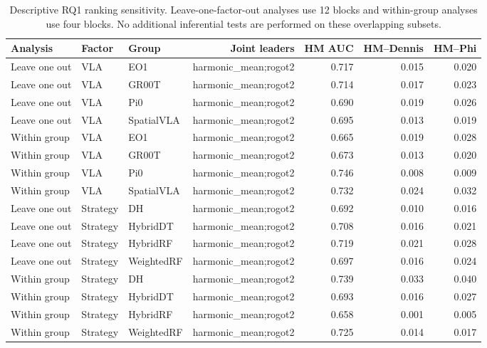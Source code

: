 \begin{table}[t]
\centering
\caption{Descriptive RQ1 ranking sensitivity. Leave-one-factor-out analyses use 12 blocks and within-group analyses use four blocks. No additional inferential tests are performed on these overlapping subsets.}
\label{tab:rq1-ranking-sensitivity}
{\scriptsize
\begin{tabular}{lllrrrr}
\toprule
Analysis & Factor & Group & Joint leaders & HM AUC & HM--Dennis & HM--Phi \\
\midrule
Leave one out & VLA & EO1 & harmonic\_mean;rogot2 & 0.717 & 0.015 & 0.020 \\
Leave one out & VLA & GR00T & harmonic\_mean;rogot2 & 0.714 & 0.017 & 0.023 \\
Leave one out & VLA & Pi0 & harmonic\_mean;rogot2 & 0.690 & 0.019 & 0.026 \\
Leave one out & VLA & SpatialVLA & harmonic\_mean;rogot2 & 0.695 & 0.013 & 0.019 \\
Within group & VLA & EO1 & harmonic\_mean;rogot2 & 0.665 & 0.019 & 0.028 \\
Within group & VLA & GR00T & harmonic\_mean;rogot2 & 0.673 & 0.013 & 0.020 \\
Within group & VLA & Pi0 & harmonic\_mean;rogot2 & 0.746 & 0.008 & 0.009 \\
Within group & VLA & SpatialVLA & harmonic\_mean;rogot2 & 0.732 & 0.024 & 0.032 \\
Leave one out & Strategy & DH & harmonic\_mean;rogot2 & 0.692 & 0.010 & 0.016 \\
Leave one out & Strategy & HybridDT & harmonic\_mean;rogot2 & 0.708 & 0.016 & 0.021 \\
Leave one out & Strategy & HybridRF & harmonic\_mean;rogot2 & 0.719 & 0.021 & 0.028 \\
Leave one out & Strategy & WeightedRF & harmonic\_mean;rogot2 & 0.697 & 0.016 & 0.024 \\
Within group & Strategy & DH & harmonic\_mean;rogot2 & 0.739 & 0.033 & 0.040 \\
Within group & Strategy & HybridDT & harmonic\_mean;rogot2 & 0.693 & 0.016 & 0.027 \\
Within group & Strategy & HybridRF & harmonic\_mean;rogot2 & 0.658 & 0.001 & 0.005 \\
Within group & Strategy & WeightedRF & harmonic\_mean;rogot2 & 0.725 & 0.014 & 0.017 \\
\bottomrule
\end{tabular}
}
\end{table}
